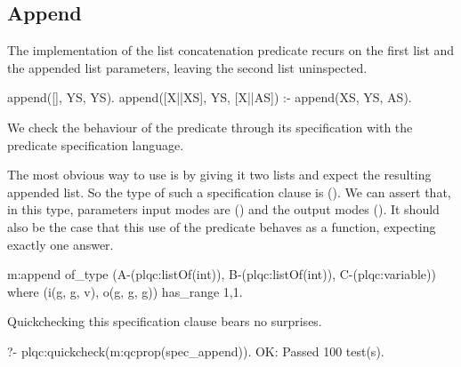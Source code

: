 

\subsection{Append}
The %
implementation of the list concatenation predicate recurs on the first list
and the appended list parameters, leaving the second list uninspected.
%
\begin{yapcode}
 append([], YS, YS).
 append([X||XS], YS, [X||AS]) :- append(XS, YS, AS).
\end{yapcode}
%
We check the behaviour of the  predicate
through its specification with the predicate specification language.
%


The most obvious way to use  is by giving it two lists and expect
the resulting appended list.
%
So the type of such a specification clause is
().
%
We can assert that, in this \plqc{} type, parameters input modes are
() and the output modes ().
%
It should also be the case that this use of the predicate behaves as a
function, expecting exactly one answer.
%
\begin{yapcode}
 m:append of_type
    (A-(plqc:listOf(int)), B-(plqc:listOf(int)), C-(plqc:variable))
   where (i(g, g, v), o(g, g, g))  has_range {1,1}.
\end{yapcode}
%
Quickchecking this specification clause bears no surprises.
%
\begin{yapcode}
   ?- plqc:quickcheck(m:qcprop(spec_append)).
 OK: Passed 100 test(s).
\end{yapcode}


